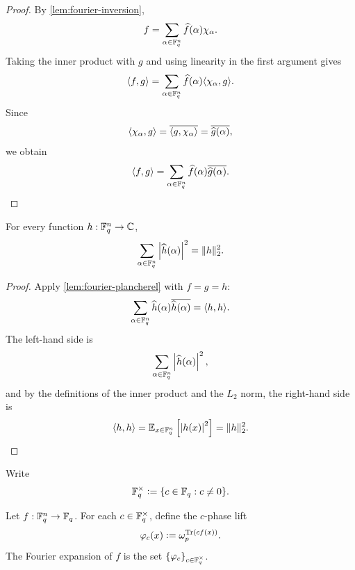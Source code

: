 \begin{proof}\leanok
By \cref{lem:fourier-inversion},
\[
    f=\sum_{\alpha\in{\mathbb F}_q^n}\widehat f(\alpha)\chi_\alpha .
\]
Taking the inner product with \(g\) and using linearity in the first argument gives
\[
    \langle f, g \rangle
    =
    \sum_{\alpha\in{\mathbb F}_q^n}
        \widehat f(\alpha)\langle \chi_\alpha, g \rangle.
\]
Since
\[
    \langle \chi_\alpha, g \rangle
    =
    \overline{\langle g, \chi_\alpha \rangle}
    =
    \overline{\widehat g(\alpha)},
\]
we obtain
\[
    \langle f, g \rangle
    =
    \sum_{\alpha\in{\mathbb F}_q^n}
        \widehat f(\alpha)\overline{\widehat g(\alpha)}.
\]
\end{proof}

\begin{lemma}
\label{lem:parseval-identity}
\leanok
For every function $h:{\mathbb F}_q^n\to{\mathbb C}$,
\[
    \sum_{\alpha\in{\mathbb F}_q^n}\left\lvert{\widehat h(\alpha)}\right\rvert^2
    =
    \|h\|_2^2.
\]
\end{lemma}

\begin{proof}\leanok
Apply \cref{lem:fourier-plancherel} with \(f=g=h\):
\[
    \sum_{\alpha\in{\mathbb F}_q^n}
        \widehat h(\alpha)\overline{\widehat h(\alpha)}
    =
    \langle h, h \rangle.
\]
The left-hand side is
\[
    \sum_{\alpha\in{\mathbb F}_q^n}\left\lvert{\widehat h(\alpha)}\right\rvert^2,
\]
and by the definitions of the inner product and the $L_2$ norm, the right-hand side is
\[
    \langle h, h \rangle
    =
    {\mathbb E}_{x\in{\mathbb F}_q^n}\left[\left\lvert{h(x)}\right\rvert^2\right]
    =
    \|h\|_2^2.
\]
\end{proof}

\begin{definition}
\label{def:nonzero-field-elements}
\leanok
Write
\[
    {\mathbb F}_q^\times \mathrel{\mathop:}= \{c\in{\mathbb F}_q : c\ne 0\}.
\]
\end{definition}

\begin{definition}
\label{def:fourier-expansion-field-valued}
\leanok
Let $f:{\mathbb F}_q^n\to{\mathbb F}_q$. For each $c\in{\mathbb F}_q^\times$, define the $c$-phase lift
\[
    {\varphi}_{c}(x) \mathrel{\mathop:}= \omega_p^{{\rm Tr}(c f(x))}.
\]
The Fourier expansion of $f$ is the set $\{\varphi_c\}_{c\in {\mathbb F}_q^\times}$.
\end{definition}

